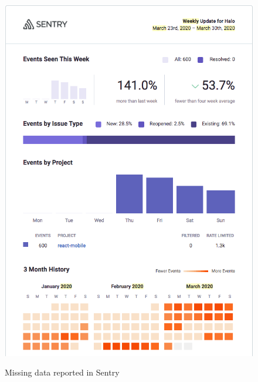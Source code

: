 \begin{figure}[htbp!]
\begin{minipage}{.5\textwidth}
  \includegraphics[width=.8\linewidth]{images/localhalo/sentry-weekly-report-23-mar-2020.png}
  \label{fig:localhalo-sentry-weekly-report-23-mar-2020}
\end{minipage}
    \caption{Missing data reported in Sentry}
    \label{fig:sentry-missing-data-march-2020}
\end{figure}

